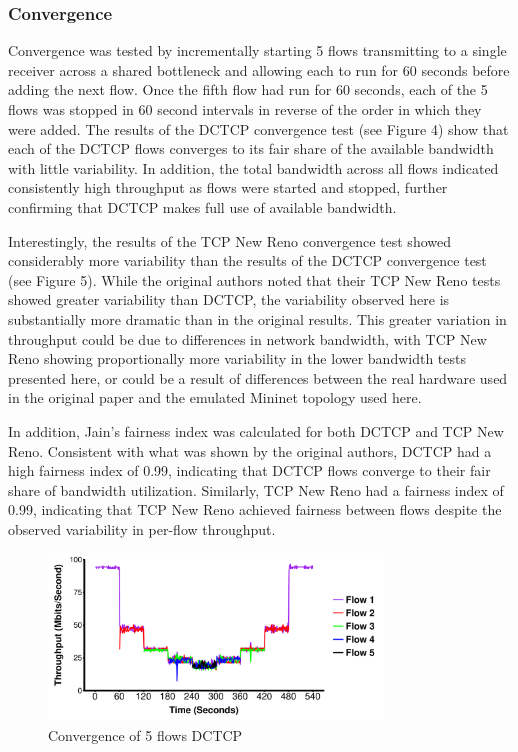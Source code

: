\subsubsection{Convergence}

Convergence was tested by incrementally starting 5 flows transmitting to a single receiver across a shared bottleneck and allowing each to run for 60 seconds before adding the next flow. Once the fifth flow had run for 60 seconds, each of the 5 flows was stopped in 60 second intervals in reverse of the order in which they were added. The results of the DCTCP convergence test (see Figure 4) show that each of the DCTCP flows converges to its fair share of the available bandwidth with little variability. In addition, the total bandwidth across all flows indicated consistently high throughput as flows were started and stopped, further confirming that DCTCP makes full use of available bandwidth.

Interestingly, the results of the TCP New Reno convergence test showed considerably more variability than the results of the DCTCP convergence test (see Figure 5). While the original authors noted that their TCP New Reno tests showed greater variability than DCTCP, the variability observed here is substantially more dramatic than in the original results. This greater variation in throughput could be due to differences in network bandwidth, with TCP New Reno showing proportionally more variability in the lower bandwidth tests presented here, or could be a result of differences between the real hardware used in the original paper and the emulated Mininet topology used here.

In addition, Jain's fairness index was calculated for both DCTCP and TCP New Reno. Consistent with what was shown by the original authors, DCTCP had a high fairness index of 0.99, indicating that DCTCP flows converge to their fair share of bandwidth utilization. Similarly, TCP New Reno had a fairness index of 0.99, indicating that TCP New Reno achieved fairness between flows despite the observed variability in per-flow throughput. 

\begin{figure}
\includegraphics[height=1.75in,width=3.5in]{dctcp_converg}
\caption{Convergence of 5 flows DCTCP}
\end{figure}

